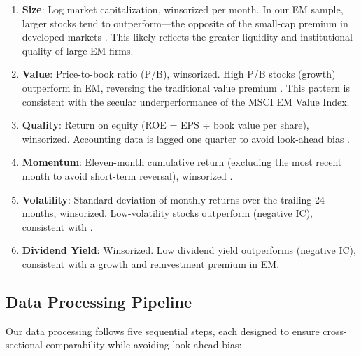\documentclass[12pt,a4paper]{article}
\begin{document}
\begin{enumerate}
    \item \textbf{Size}: Log market capitalization, winsorized per month. In our EM sample, larger stocks tend to outperform---the opposite of the small-cap premium in developed markets \citep{famafrench1993}. This likely reflects the greater liquidity and institutional quality of large EM firms.

    \item \textbf{Value}: Price-to-book ratio (P/B), winsorized. High P/B stocks (growth) outperform in EM, reversing the traditional value premium \citep{famafrench2012}. This pattern is consistent with the secular underperformance of the MSCI EM Value Index.

    \item \textbf{Quality}: Return on equity (ROE = EPS $\div$ book value per share), winsorized. Accounting data is lagged one quarter to avoid look-ahead bias \citep{novymarx2013}.

    \item \textbf{Momentum}: Eleven-month cumulative return (excluding the most recent month to avoid short-term reversal), winsorized \citep{jegadeeshtitman1993, carhart1997}.

    \item \textbf{Volatility}: Standard deviation of monthly returns over the trailing 24 months, winsorized. Low-volatility stocks outperform (negative IC), consistent with \citet{ang2006}.

    \item \textbf{Dividend Yield}: Winsorized. Low dividend yield outperforms (negative IC), consistent with a growth and reinvestment premium in EM.
\end{enumerate}

\subsection{Data Processing Pipeline}

Our data processing follows five sequential steps, each designed to ensure cross-sectional comparability while avoiding look-ahead bias:
\end{document}
